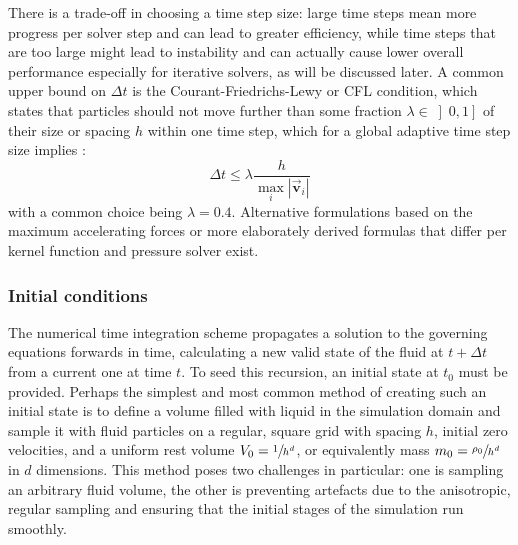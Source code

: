 \documentclass[oneside, a4paper]{book}
\newcommand\abs[1]{\left|#1\right|}
\newcommand\vek[1]{\vec{\bm{#1}}}
\begin{document}
    There is a trade-off in choosing a time step size: large time steps mean more progress per solver step and can lead to greater efficiency, while time steps that are too large might lead to instability and can actually cause lower overall performance especially for iterative solvers, as will be discussed later. A common upper bound on $\Delta t$ is the Courant-Friedrichs-Lewy or CFL condition, which states that particles should not move further than some fraction $\lambda\in\left]0,1\right]$ of their size or spacing $h$ within one time step, which for a global adaptive time step size implies \autocite{tutorial2019}:
    \begin{equation}\label{eq:cfl-condition}
      \Delta t \leq \lambda \frac{h}{\max_i \abs{\vek{v}_i}}
    \end{equation}
    with a common choice \autocites{dfsph}{monaghan92} being $\lambda=0.4$. Alternative formulations based on the maximum accelerating forces \autocites{monaghan92}{time-adaptive-sph} or more elaborately derived formulas that differ per kernel function and pressure solver \autocite{optimal-timestep} exist.


    \subsubsection{Initial conditions}\label{subsec:initial-conditions}
    The numerical time integration scheme propagates a solution to the governing equations forwards in time, calculating a new valid state of the fluid at $t+\Delta t$ from a current one at time $t$. To seed this recursion, an initial state at $t_0$ must be provided. Perhaps the simplest and most common method of creating such an initial state is to define a volume filled with liquid in the simulation domain and sample it with fluid particles on a regular, square grid with spacing $h$, initial zero velocities, and a uniform rest volume $V_0=\sfrac{1}{h^d}$, or equivalently mass $m_0 = \sfrac{\rho_0 }{h^d}$ in $d$ dimensions. This method poses two challenges in particular: one is sampling an arbitrary fluid volume, the other is preventing artefacts due to the anisotropic, regular sampling and ensuring that the initial stages of the simulation run smoothly. 
\end{document}
